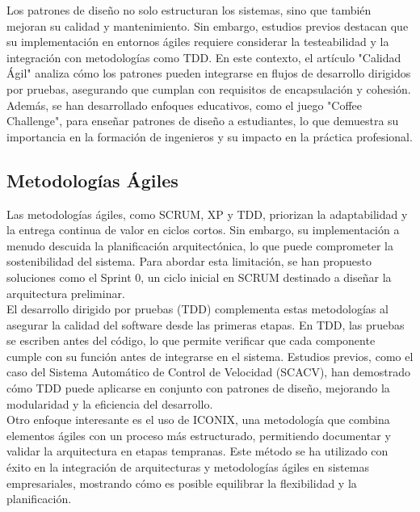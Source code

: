\documentclass[conference]{IEEEtran}
\begin{document}
Los patrones de diseño no solo estructuran los sistemas, sino que también mejoran su calidad y mantenimiento. Sin embargo, estudios previos destacan que su implementación en entornos ágiles requiere considerar la testeabilidad y la integración con metodologías como TDD. En este contexto, el artículo "Calidad Ágil" analiza cómo los patrones pueden integrarse en flujos de desarrollo dirigidos por pruebas, asegurando que cumplan con requisitos de encapsulación y cohesión.\\

Además, se han desarrollado enfoques educativos, como el juego "Coffee Challenge", para enseñar patrones de diseño a estudiantes, lo que demuestra su importancia en la formación de ingenieros y su impacto en la práctica profesional.\\

\subsection{Metodologías Ágiles}
Las metodologías ágiles, como SCRUM, XP y TDD, priorizan la adaptabilidad y la entrega continua de valor en ciclos cortos. Sin embargo, su implementación a menudo descuida la planificación arquitectónica, lo que puede comprometer la sostenibilidad del sistema. Para abordar esta limitación, se han propuesto soluciones como el Sprint 0, un ciclo inicial en SCRUM destinado a diseñar la arquitectura preliminar.\\

El desarrollo dirigido por pruebas (TDD) complementa estas metodologías al asegurar la calidad del software desde las primeras etapas. En TDD, las pruebas se escriben antes del código, lo que permite verificar que cada componente cumple con su función antes de integrarse en el sistema. Estudios previos, como el caso del Sistema Automático de Control de Velocidad (SCACV), han demostrado cómo TDD puede aplicarse en conjunto con patrones de diseño, mejorando la modularidad y la eficiencia del desarrollo.\\

Otro enfoque interesante es el uso de ICONIX, una metodología que combina elementos ágiles con un proceso más estructurado, permitiendo documentar y validar la arquitectura en etapas tempranas. Este método se ha utilizado con éxito en la integración de arquitecturas y metodologías ágiles en sistemas empresariales, mostrando cómo es posible equilibrar la flexibilidad y la planificación.\\
\end{document}
